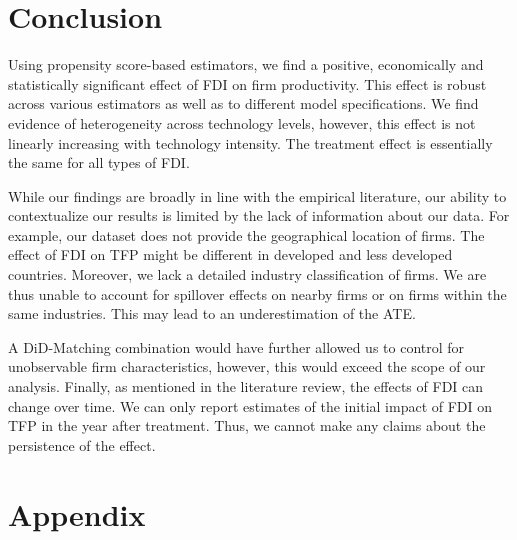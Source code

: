 \documentclass[a4paper,11pt]{scrartcl}
\begin{document}
\section{Conclusion}

Using propensity score-based estimators, we find a positive, economically and statistically significant effect of FDI on firm productivity. This effect is robust across various estimators as well as to different model specifications. We find evidence of heterogeneity across technology levels, however, this effect is not linearly increasing with technology intensity. 
The treatment effect is essentially the same for all types of FDI. 

While our findings are broadly in line with the empirical literature, our ability to contextualize our results is limited by the lack of information about our data. For example, our dataset does not provide the geographical location of firms. The effect of FDI on TFP might be different in developed and less developed countries. 
Moreover, we lack a detailed industry classification of firms. We are thus unable to account for spillover effects on nearby firms or on firms within the same industries. This may lead to an underestimation of the ATE.

A DiD-Matching combination would have further allowed us to control for unobservable firm characteristics, however, this would exceed the scope of our analysis. Finally, as mentioned in the literature review, the effects of FDI can change over time. 
We can only report estimates of the initial impact of FDI on TFP in the year after treatment. Thus, we cannot make any claims about the persistence of the effect.  

\newpage

 
\newpage


\setcounter{page}{3} %

\appendix
\section{Appendix} 
\setcounter{table}{0}
\end{document}
